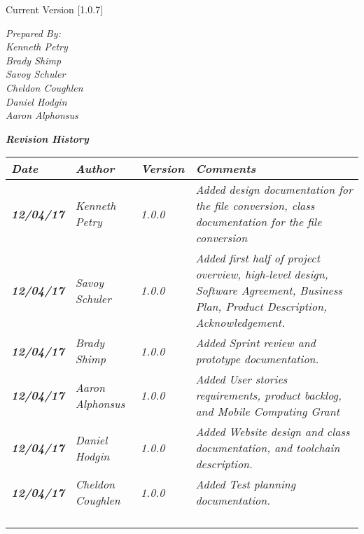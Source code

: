 


Current Version [1.0.7]
\vspace*{5mm}

{\color{SDColor5}
\noindent
\textit{Prepared By:}\\
\textit{Kenneth Petry}\\
\textit{Brady Shimp}\\
\textit{Savoy Schuler}\\
\textit{Cheldon Coughlen}\\
\textit{Daniel Hodgin}\\
\textit{Aaron Alphonsus}
}

\vfill
\noindent
{\color{SDColor3} \textit{\textbf{Revision History}}}\\
\begin{tabular}{|>{\raggedright}p{1.5cm}|>{\raggedright}p{3cm}|>{\raggedright}p{1.5cm}|>{\raggedright}p{9cm}|}
  \hline
  \textit{\textbf{Date}} &  \textit{\textbf{Author}} & \textit{\textbf{Version}} & \textit{\textbf{Comments}}\tabularnewline
  \hline
  \textit{\textbf{12/04/17}} & \textit{Kenneth Petry} & \textit{1.0.0} & \textit{Added design documentation for the file conversion, class documentation for the file conversion}\tabularnewline\hline
  \textit{\textbf{12/04/17}} & \textit{Savoy Schuler} & \textit{1.0.0} & \textit{Added first half of project overview, high-level design, Software Agreement, Business Plan, Product Description, Acknowledgement.}\tabularnewline\hline
  \textit{\textbf{12/04/17}} & \textit{Brady Shimp} & \textit{1.0.0} & \textit{Added Sprint review and prototype documentation.}\tabularnewline\hline
  \textit{\textbf{12/04/17}} & \textit{Aaron Alphonsus} & \textit{1.0.0} & \textit{Added User stories requirements, product backlog, and Mobile Computing Grant}\tabularnewline\hline
  \textit{\textbf{12/04/17}} & \textit{Daniel Hodgin} & \textit{1.0.0} & \textit{Added Website design and class documentation, and toolchain description.}\tabularnewline\hline
  \textit{\textbf{12/04/17}} & \textit{Cheldon Coughlen} & \textit{1.0.0} & \textit{Added Test planning documentation.}\tabularnewline\hline
  &  &  & \tabularnewline
  \hline
  &  &  & \tabularnewline
  \hline
  &  &  & \tabularnewline
  \hline
  &  &  & \tabularnewline
  \hline
\end{tabular}
\vfill

